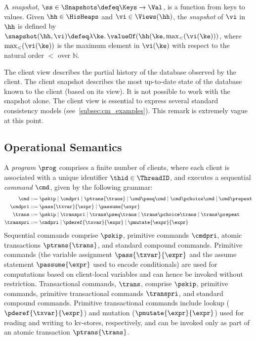 \begin{definition}[Snapshots]
\label{def:heaps}
\label{def:snapshot}
A \emph{snapshot}, \( \ss \in \Snapshots  \defeq \Keys \to
\Val\),  is a function  from keys to values.
Given $\hh \in \HisHeaps$ and $\vi \in \Views(\hh)$, the \emph{snapshot} of $\vi$ in 
$\hh$ is defined by  $\snapshot(\hh, \vi) \defeq \lambda \ke \ldotp \valueOf(\hh(\ke, \max_{<}(\vi(\ke)))$, 
where $\max_{<}(\vi(\ke))$ is the maximum element in $\vi(\ke)$ with respect to the natural 
order $<$ over $\mathbb{N}$.
\end{definition}

\begin{remark}
The client view describes the partial history of the database observed by the client. 
The client snapshot describes the most up-to-date state of the database known to the client (based on its view). 
It is not possible to work with the snapshot alone. 
The client view is essential to express several standard consistency models (see~\cref{subsec:cm_examples}). 
\ac{This remark is extremely vague at this point.}
\end{remark}


\subsection{Operational Semantics}

A \emph{program} \( \prog \) comprises a finite number of clients,
where each client is associated with a unique identifier \( \thid \in \ThreadID \), 
and executes a sequential \emph{command} $\cmd$, given by the following grammar:
\begin{align*}
\cmd & ::=  
\pskip \mid 
\cmdpri \mid  
\ptrans{\trans} \mid 
\cmd \pseq \cmd \mid 
\cmd \pchoice \cmd \mid 
\cmd \prepeat  
\\
\cmdpri & ::=  
\pass{\txvar}{\expr} \mid 
\passume{\expr} 
\\
\trans & ::=
\pskip \mid
\transpri \mid 
\trans \pseq \trans \mid
\trans \pchoice \trans \mid
\trans\prepeat    
\\
\transpri & ::= 
\cmdpri \mid
\pderef{\txvar}{\expr} \mid
\pmutate{\expr}{\expr} 
\end{align*} 
%
%
Sequential commands  comprise $\pskip$,  primitive commands $\cmdpri
$, atomic transactions
$\ptrans{\trans}$,  and standard
compound commands. 
Primitive commands (the variable assignment
$\pass{\txvar}{\expr}$ and the assume statement $\passume{\expr}$
used to encode conditionals) are used for computations based on 
client-local variables 
and can hence be invoked without restriction. 
Transactional commands, $\trans$, 
comprise $\pskip$, primitive commands, 
primitive transactional commands $\transpri$,  and standard compound commands. 
Primitive transactional commands include lookup ($\pderef{\txvar}{\expr}$) and mutation 
($\pmutate{\expr}{\expr}$) used for reading and writing to kv-stores, respectively, and  
can be invoked only as part of an atomic transaction $\ptrans{\trans}$.

